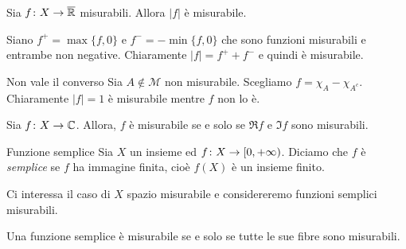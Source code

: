\documentclass[a4paper]{article}
\begin{document}
\begin{radioactive}
\begin{snippetproposition}{}
    Sia \(f \colon X \to \overline {\mathbb{R}}\)
    misurabili. Allora \(|f|\) è misurabile.
\end{snippetproposition}
\end{radioactive}

\begin{radioactive}
\begin{snippetproof}{}
    Siano \(f^+ = \max\{f,0\}\) e \(f^- = -\min\{f,0\}\)
    che sono funzioni misurabili e entrambe non negative.
    Chiaramente \(|f| = f^+ + f^-\) e quindi è misurabile.
\end{snippetproof}
\end{radioactive}

\begin{radioactive}
\begin{snippetexample}{Non vale il converso}
    Sia \(A \notin \mathcal M\) non misurabile. Scegliamo
    \(f = \chi_A - \chi_{A^c}\). Chiaramente \(|f| = 1\) è misurabile
    mentre \(f\) non lo è.
\end{snippetexample}
\end{radioactive}

\begin{radioactive}
\begin{snippetproposition}{}
    Sia \(f \colon X \to \mathbb{C}\).
    Allora, \(f\) è misurabile se e solo se \(\Re f\) e \(\Im f\) sono misurabili.
\end{snippetproposition}
\end{radioactive}

\begin{radioactive}
\begin{snippetdefinition}{Funzione semplice}
    Sia \(X\) un insieme ed \(f \colon X \to [0,+\infty)\).
    Diciamo che \(f\) è \emph{semplice} se \(f\) ha immagine finita, cioè
    \(f(X)\) è un insieme finito.
\end{snippetdefinition}
\end{radioactive}

\begin{radioactive}
Ci interessa il caso di \(X\) spazio misurabile e considereremo funzioni semplici misurabili.
\end{radioactive}

\begin{radioactive}
\begin{snippetproposition}{}
    Una funzione semplice è misurabile se e solo se
    tutte le sue fibre sono misurabili.
\end{snippetproposition}
\end{radioactive}
\end{document}
